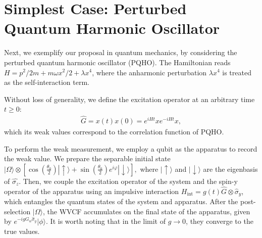 \documentclass[twocolumn,pra,aps,superscriptaddress]{revtex4-2}
\begin{document}
\section {Simplest Case: Perturbed Quantum Harmonic Oscillator}\label{PQHO}

Next, we exemplify our proposal in quantum mechanics, by considering the perturbed quantum harmonic oscillator (PQHO). 
The Hamiltonian reads $H=p^2/2m+m\omega x^2/2+\lambda x^{4}$, where the anharmonic perturbation $\lambda x^{4}$ is treated as the self-interaction term. 

Without loss of generality, we define the excitation operator at an arbitrary time $t\geq 0$:
\begin{align}
 \hat{G}=x(t)x(0)=e^{iHt}xe^{-iHt}x,
 \end{align}
which its weak values correspond to the correlation function of PQHO.

To perform the weak measurement, we employ a qubit as the apparatus to record the weak value. We prepare the separable initial state
$
|\Omega\rangle\otimes\left[\cos\left(\frac{\theta_0}{2}\right) |\uparrow\rangle  +  \sin\left(\frac{\theta_0}{2}\right) e^{i\varphi}|\downarrow\rangle\right],
$
where $|\uparrow\rangle$ and $|\downarrow\rangle$ are the eigenbasis of $\hat{\sigma_z}$. Then, we couple the excitation operator of the system and the spin-y operator of the apparatus using an impulsive interaction
$H_{\text{int}}=g(t)\hat{G}\otimes\hat{\sigma}_{y}$,
which entangles the quantum states of the system and apparatus. After the post-selection $|\Omega\rangle$, the WVCF accumulates on the final state of the apparatus, given by $e^{-igG_w\hat{\sigma}_{y}} |\phi\rangle$.
It is worth noting that in the limit of $g\rightarrow0$, they converge to the true values.
\end{document}
